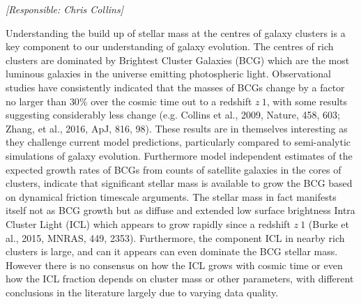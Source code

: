 \documentclass[a4paper,11pt]{article}
\begin{document}
{\it [Responsible: Chris Collins]}

\noindent
Understanding the build up of stellar mass at the centres of galaxy
clusters is a key component to our understanding of galaxy
evolution. The centres of rich clusters are dominated by Brightest
Cluster Galaxies (BCG) which are the most luminous galaxies in the
universe emitting photospheric light. Observational studies have
consistently indicated that the masses of BCGs change by a factor no
larger than $30\%$ over the cosmic time out to a redshift $ z~1$, with
some results suggesting considerably less change (e.g. Collins et al.,
2009, Nature, 458, 603; Zhang, et al., 2016, ApJ, 816, 98). These
results are in themselves interesting as they challenge current model
predictions, particularly compared to semi-analytic simulations of
galaxy evolution. Furthermore model independent estimates of the
expected growth rates of BCGs from counts of satellite galaxies in the
cores of clusters, indicate that significant stellar mass is available
to grow the BCG based on dynamical friction timescale arguments. The
stellar mass in fact manifests itself not as BCG growth but as diffuse
and extended low surface brightness Intra Cluster Light (ICL) which
appears to grow rapidly since a redshift $z~1$ (Burke et al., 2015,
MNRAS, 449, 2353). Furthermore, the component ICL in nearby rich
clusters is large, and can it appears can even dominate the BCG
stellar mass. However there is no consensus on how the ICL grows with
cosmic time or even how the ICL fraction depends on cluster mass or
other parameters, with different conclusions in the literature largely
due to varying data quality.
\end{document}
